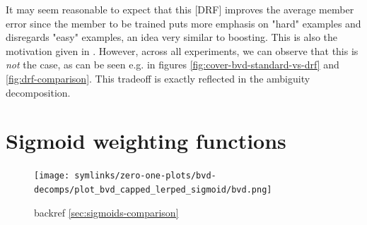 \documentclass[
	twoside=false, %
]{kaobook}
\begin{document}


It may seem reasonable to expect that this [DRF] improves the average member error since the member to be trained puts more emphasis on "hard" examples and disregards "easy" examples, an idea very similar to boosting. This is also the motivation given in \cite{bernard_DynamicRandomForests_2012, xu_ImplementationPerformanceOptimization_2017}. However, across all experiments, we can observe that this is \textit{not} the case, as can be seen e.g. in figures \ref{fig:cover-bvd-standard-vs-drf} and \ref{fig:drf-comparison}.
This tradeoff is exactly reflected in the ambiguity decomposition.


\section{Sigmoid weighting functions}

\begin{figure}
    \texttt{[image: symlinks/zero-one-plots/bvd-decomps/plot\_bvd\_capped\_lerped\_sigmoid/bvd.png]}
    \caption{
        backref \ref{sec:sigmoids-comparison}
    }
    \label{fig:sigmoids-full-results}
\end{figure}
\end{document}

